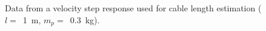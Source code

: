 
\begin{figure}
    \captionsetup[subfigure]{justification=centering}
    \centering
    \caption{Data from a velocity step response used for cable length estimation 
    ($l =$~\SI{1}{\metre}, $m_p =$~\SI{0.3}{\kilo\gram}).}
    \label{fig:FFT_vel_step_subfigs}  
\end{figure}